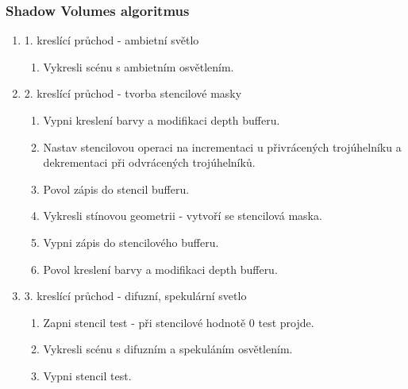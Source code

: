 \begin{frame}
  \frametitle{Shadow Volumes algoritmus}
  \begin{enumerate}
    \item 1. kreslící průchod - ambietní světlo
      \begin{enumerate}
        \item Vykresli scénu s ambietním osvětlením.
      \end{enumerate}
    \item 2. kreslící průchod - tvorba stencilové masky
      \begin{enumerate}
        \item Vypni kreslení barvy a modifikaci depth bufferu.
        \item Nastav stencilovou operaci na incrementaci u přivrácených trojúhelníku a dekrementaci při odvrácených trojúhelníků.
        \item Povol zápis do stencil bufferu.
        \item Vykresli stínovou geometrii - vytvoří se stencilová maska.
        \item Vypni zápis do stencilového bufferu.
        \item Povol kreslení barvy a modifikaci depth bufferu.
      \end{enumerate}

    \item 3. kreslící průchod - difuzní, spekulární svetlo
      \begin{enumerate}
        \item Zapni stencil test -  při stencilové hodnotě 0 test projde.
        \item Vykresli scénu s difuzním a spekuláním osvětlením.
        \item Vypni stencil test.
      \end{enumerate}
  \end{enumerate}
\end{frame}

